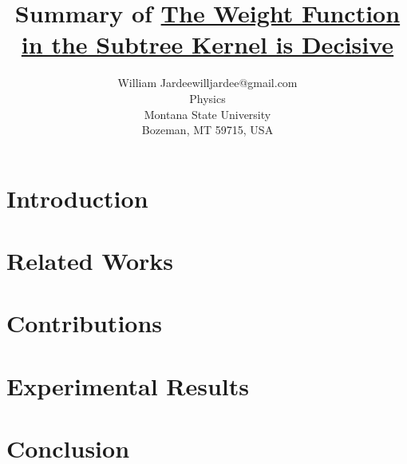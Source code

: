 \documentclass[twoside,11pt]{article}
\begin{document}
\title{Summary of \ul{The Weight Function in the Subtree Kernel is Decisive}}

\author{\name William Jardee\email willjardee@gmail.com \\
       \addr Physics\\
       Montana State University\\
       Bozeman, MT 59715, USA
       }

\maketitle

\begin{abstract}%

\end{abstract}
 
\section{Introduction}
\label{sec:intro}



\section{Related Works}
\label{sec:related works}



\section{Contributions}
\label{sec:contributions}
 
 
 
\section{Experimental Results}
\label{sec:experiment}



\section{Conclusion}
\label{sec:conc}



\vskip 0.2in

\end{document}
